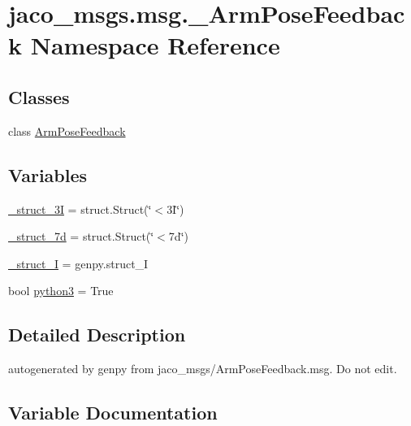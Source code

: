 \hypertarget{namespacejaco__msgs_1_1msg_1_1__ArmPoseFeedback}{}\section{jaco\+\_\+msgs.\+msg.\+\_\+\+Arm\+Pose\+Feedback Namespace Reference}
\label{namespacejaco__msgs_1_1msg_1_1__ArmPoseFeedback}
\subsection*{Classes}
\begin{DoxyCompactItemize}
\item 
class \hyperlink{classjaco__msgs_1_1msg_1_1__ArmPoseFeedback_1_1ArmPoseFeedback}{Arm\+Pose\+Feedback}
\end{DoxyCompactItemize}
\subsection*{Variables}
\begin{DoxyCompactItemize}
\item 
\hyperlink{namespacejaco__msgs_1_1msg_1_1__ArmPoseFeedback_a5d7b045f72e29f5b145043b2df0c0282}{\+\_\+struct\+\_\+3I} = struct.\+Struct(\char`\"{}$<$3\+I\char`\"{})
\item 
\hyperlink{namespacejaco__msgs_1_1msg_1_1__ArmPoseFeedback_a77b1416260484e8a4c894671e5e40008}{\+\_\+struct\+\_\+7d} = struct.\+Struct(\char`\"{}$<$7d\char`\"{})
\item 
\hyperlink{namespacejaco__msgs_1_1msg_1_1__ArmPoseFeedback_a093e1d065eba71c6b3c58ea69d11835d}{\+\_\+struct\+\_\+I} = genpy.\+struct\+\_\+I
\item 
bool \hyperlink{namespacejaco__msgs_1_1msg_1_1__ArmPoseFeedback_adb13f3400fc8b9271c3d466c9ee2a1cf}{python3} = True
\end{DoxyCompactItemize}


\subsection{Detailed Description}
\begin{DoxyVerb}autogenerated by genpy from jaco_msgs/ArmPoseFeedback.msg. Do not edit.\end{DoxyVerb}
 

\subsection{Variable Documentation}
